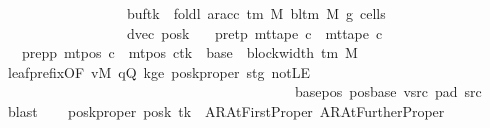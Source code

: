 \begin{isabellebody}
\ \ \ \ \ \ \ \ \ \ \ \ \ \ \ \ \ \ buf{\isacharparenleft}{\kern0pt}tk\ {\isacharcolon}{\kern0pt}{\isacharequal}{\kern0pt}\ foldl\ {\isacharparenleft}{\kern0pt}ar{\isacharunderscore}{\kern0pt}acc\ {\isacharparenleft}{\kern0pt}{\isasymGamma}{\isacharunderscore}{\kern0pt}tm\ M{\isacharparenright}{\kern0pt}\ {\isacharparenleft}{\kern0pt}bl{\isacharunderscore}{\kern0pt}tm\ M{\isacharparenright}{\kern0pt}{\isacharparenright}{\kern0pt}\ {\isacharquery}{\kern0pt}g{}\ {\isacharquery}{\kern0pt}cells{}{\isacharparenright}{\kern0pt}{\isacharcomma}{\kern0pt}\isanewline
\ \ \ \ \ \ \ \ \ \ \ \ \ \ \ \ \ \ dvec{\isacharcomma}{\kern0pt}\ {\isacharquery}{\kern0pt}posk{\isacharprime}{\kern0pt}{\isacharparenright}{\kern0pt}{\isachardoublequoteclose}\isanewline
\ \ \ pre{\isacharunderscore}{\kern0pt}tp{\isacharcolon}{\kern0pt}\ {\isachardoublequoteopen}mt{\isacharunderscore}{\kern0pt}tape\ c{}\ {\isacharequal}{\kern0pt}\ mt{\isacharunderscore}{\kern0pt}tape\ c{\isacharprime}{\kern0pt}{\isachardoublequoteclose}\isanewline
\ \ \ pre{\isacharunderscore}{\kern0pt}pp{\isacharcolon}{\kern0pt}\ {\isachardoublequoteopen}mt{\isacharunderscore}{\kern0pt}pos\ c{}\ {\isacharequal}{\kern0pt}\ {\isacharparenleft}{\kern0pt}mt{\isacharunderscore}{\kern0pt}pos\ c{\isacharprime}{\kern0pt}{\isacharparenright}{\kern0pt}{\isacharparenleft}{\kern0pt}tk\ {\isacharcolon}{\kern0pt}{\isacharequal}{\kern0pt}\ base\ {\isacharplus}{\kern0pt}\ {\isacharparenleft}{\kern0pt}block{\isacharunderscore}{\kern0pt}width\ {\isacharparenleft}{\kern0pt}{\isasymGamma}{\isacharunderscore}{\kern0pt}tm\ M{\isacharparenright}{\kern0pt}\ {\isacharminus}{\kern0pt}\ {}{\isacharparenright}{\kern0pt}{\isacharparenright}{\kern0pt}{\isachardoublequoteclose}\isanewline
\ \ \ \ \isamarkupfalse%
\ leaf{\isacharunderscore}{\kern0pt}prefix{\isacharbrackleft}{\kern0pt}OF\ vM\ qQ\ kge{}\ posk{\isacharunderscore}{\kern0pt}proper\ stg\ notLE\isanewline
\ \ \ \ \ \ \ \ \ \ \ \ \ \ \ \ \ \ \ \ \ \ \ \ \ \ \ \ \ \ \ \ \ \ \ \ \ \ \ \ \ \ base{\isacharunderscore}{\kern0pt}pos\ pos{\isacharunderscore}{\kern0pt}base\ vsrc\ pad{}\ src{}{\isacharbrackright}{\kern0pt}\ \isamarkupfalse%
\ blast\isanewline
\ \ \isamarkupfalse%
\ posk{\isacharprime}{\kern0pt}{\isacharunderscore}{\kern0pt}proper{\isacharcolon}{\kern0pt}\ {\isachardoublequoteopen}{\isacharquery}{\kern0pt}posk{\isacharprime}{\kern0pt}\ tk\ {\isasymin}\ {\isacharbraceleft}{\kern0pt}AR{\isacharunderscore}{\kern0pt}AtFirstProper{\isacharcomma}{\kern0pt}\ AR{\isacharunderscore}{\kern0pt}AtFurtherProper{\isacharbraceright}{\kern0pt}{\isachardoublequoteclose}\ \isamarkupfalse%

\end{isabellebody}
